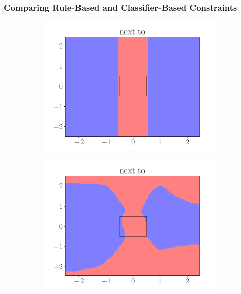 \documentclass{beamer}
\begin{document}
\begin{frame}
    \frametitle{Comparing Rule-Based and Classifier-Based Constraints}
    \begin{figure}[ht]
    \centering
        \begin{subfigure}{0.45\textwidth}
            \centering
            \includegraphics[width=\textwidth]{figures/next_to_rule.pdf}
        \end{subfigure}
        \begin{subfigure}{0.45\textwidth}
            \centering
            \includegraphics[width=\textwidth]{figures/next_to_predicate_only.pdf}
        \end{subfigure}
        \begin{subfigure}{0.45\textwidth}

\end{subfigure}
\end{figure}
\end{frame}
\end{document}
